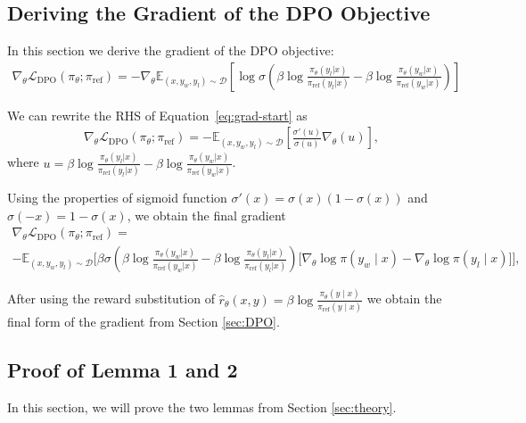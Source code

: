 \documentclass{article}
\newcommand{\piref}{\pi_\text{ref}}
\begin{document}
\subsection{Deriving the Gradient of the DPO Objective}
\label{app:gradient_derivation}
In this section we derive the gradient of the DPO objective:
\begin{align}\label{eq:grad-start}
    \nabla_{\theta}\mathcal{L}_\text{DPO}(\pi_{\theta}; \piref)
    = -\nabla_{\theta}\mathbb{E}_{(x, y_w, y_l)\sim \mathcal{D}}\left[\log \sigma \left(\beta \log \frac{\pi_{\theta}(y_l|x)}{\piref(y_l|x)} - \beta \log \frac{\pi_{\theta}(y_w|x)}{\piref(y_w|x)}\right)\right]
\end{align}

We can rewrite the RHS of Equation~\ref{eq:grad-start} as 
\begin{align}
    \nabla_{\theta}\mathcal{L}_\text{DPO}(\pi_{\theta}; \piref)
    =-\mathbb{E}_{(x, y_w, y_l)\sim \mathcal{D}}\left[\frac{\sigma'\left(u\right)}{\sigma \left(u\right)}\nabla_{\theta}\left(u\right)\right],
\end{align}
where $u = \beta \log \frac{\pi_{\theta}(y_l|x)}{\piref(y_l|x)} - \beta \log \frac{\pi_{\theta}(y_w|x)}{\piref(y_w|x)}$.

Using the properties of sigmoid function $\sigma'(x) = \sigma(x)(1-\sigma(x))$ and $\sigma(-x) = 1-\sigma(x)$, we obtain the final gradient
\begin{multline*}
\nabla_{\theta}\mathcal{L}_\text{DPO}(\pi_{\theta}; \piref) = \\
     -\mathbb{E}_{(x, y_w, y_l) \sim \mathcal{D}} \bigg[\beta\sigma \left(\beta \log \frac{\pi_{\theta}(y_w|x)}{\piref(y_w|x)} - \beta \log \frac{\pi_{\theta}(y_l|x)}{\piref(y_l|x)}\right)\bigg[\nabla_\theta\log \pi(y_w \mid x) - \nabla_\theta\log\pi(y_l \mid x)\bigg]\bigg],
\end{multline*}

After using the reward substitution of $\hat{r}_\theta(x, y) = \beta \log \frac{\pi_\theta(y \mid x)}{\piref(y \mid x)}$ we obtain the final form of the gradient from Section \ref{sec:DPO}.

\subsection{Proof of Lemma 1 and 2}
\label{app:lemma1}

In this section, we will prove the two lemmas from Section \ref{sec:theory}.
\end{document}
